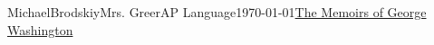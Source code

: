 \documentclass[12pt,letterpaper]{article}
\begin{document}
\begin{mla}{Michael}{Brodskiy}{Mrs. Greer}{AP Language}{\today}{\underline{The Memoirs of George Washington}} 

  \begin{justifying}

    \paragraph{} 
      
\end{justifying}

\end{mla}
\end{document}
